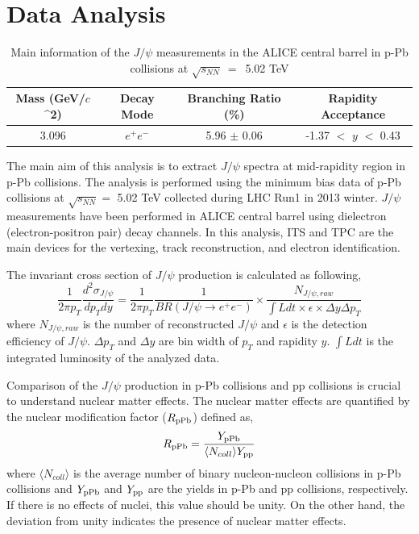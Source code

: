 \chapter{Data Analysis}
\label{chap_ana}
\begin{table}[!h]
\begin{center}
	\begin{tabular}{cccc} \hline
		Mass (GeV/$c$^{2})    & Decay Mode & Branching Ratio (\%) & Rapidity Acceptance \\ \hline
 		3.096                           & $e^{+}e^{-}$   &  5.96  $\pm$ 0.06                         & -1.37 $<$ $y$ $<$ 0.43 \\ \hline
	\end{tabular}
\end{center}
	\caption{Main information of the $J/\psi$ measurements in the ALICE central barrel in p-Pb collisions at $\sqrt{s_{NN}}~=$~5.02 TeV}
\end{table}
The main aim of this analysis is to extract $J/\psi$ spectra at mid-rapidity region in p-Pb collisions.  
The analysis is performed using the minimum bias data of p-Pb collisions at $\sqrt{s_{NN}} =$ 5.02 TeV collected during LHC Run1 in 2013 winter.
$J/\psi$ measurements have been performed in ALICE central barrel using dielectron (electron-positron pair) decay channels. 
In this analysis, ITS and TPC are the main devices for the vertexing,  track reconstruction, and electron identification.

The invariant cross section of $J/\psi$ production is calculated as following,  
\begin{equation}
  \frac{1}{2\pi p_{T}}\frac{d^{2}\sigma_{J/\psi}}{dp_{T}dy} =  \frac{1}{2\pi p_{T}}\frac{1}{BR(J/\psi\rightarrow e^{+}e^{-})} \times \frac{N_{J/\psi ,raw}}{\int{L}dt \times \epsilon \times \Delta y \Delta p_{T}}
\end{equation}
where $N_{J/\psi ,raw}$ is the number of reconstructed $J/\psi$ and $\epsilon$ is the detection efficiency of $J/\psi$. 
$\Delta p_{T}$ and $\Delta y$ are bin width of $p_{T}$ and rapidity $y$. 
$\int{L}dt$ is the integrated luminosity of the analyzed data.

Comparison of the $J/\psi$ production in p-Pb collisions and pp collisions is crucial to understand nuclear matter effects. 
The nuclear matter effects are quantified by the nuclear modification factor ($R_{\rm{pPb}}$) defined as, 
\begin{equation}
  R_{\rm{pPb}} = \frac{Y_{\rm{pPb}}}{\langle N_{coll}\rangle Y_{\rm{pp}}}
\end{equation}
where $\langle N_{coll}\rangle$ is the average number of binary nucleon-nucleon collisions in p-Pb collisions and $Y_{\rm{pPb}}$ and $Y_{\rm{pp}}$ are the yields in p-Pb and pp collisions, respectively.
If there is no effects of nuclei, this value should be unity. 
On the other hand, the deviation from unity indicates the presence of nuclear matter effects.


